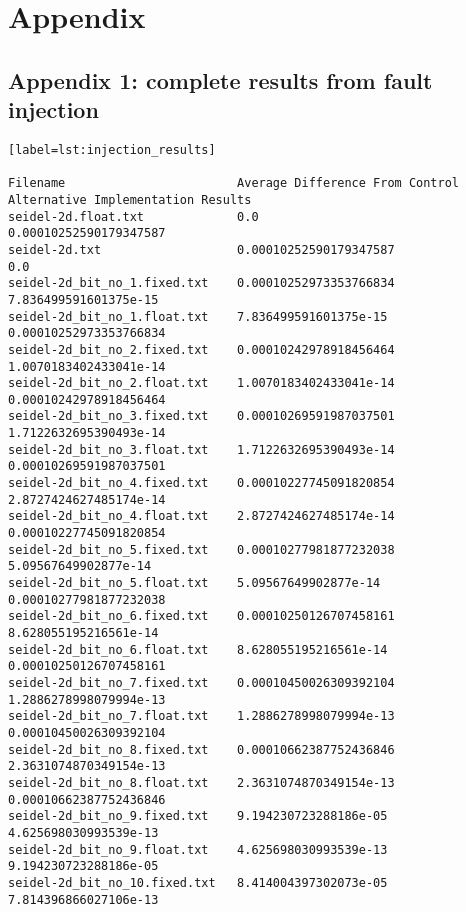 \section{Appendix}

\subsection{Appendix 1: complete results from fault injection}

\begin{verbatim}[label=lst:injection_results]

Filename                        Average Difference From Control         Alternative Implementation Results
seidel-2d.float.txt             0.0                                     0.00010252590179347587
seidel-2d.txt                   0.00010252590179347587                  0.0
seidel-2d_bit_no_1.fixed.txt    0.00010252973353766834                  7.836499591601375e-15
seidel-2d_bit_no_1.float.txt    7.836499591601375e-15                   0.00010252973353766834
seidel-2d_bit_no_2.fixed.txt    0.00010242978918456464                  1.0070183402433041e-14
seidel-2d_bit_no_2.float.txt    1.0070183402433041e-14                  0.00010242978918456464
seidel-2d_bit_no_3.fixed.txt    0.00010269591987037501                  1.7122632695390493e-14
seidel-2d_bit_no_3.float.txt    1.7122632695390493e-14                  0.00010269591987037501
seidel-2d_bit_no_4.fixed.txt    0.00010227745091820854                  2.8727424627485174e-14
seidel-2d_bit_no_4.float.txt    2.8727424627485174e-14                  0.00010227745091820854
seidel-2d_bit_no_5.fixed.txt    0.00010277981877232038                  5.09567649902877e-14
seidel-2d_bit_no_5.float.txt    5.09567649902877e-14                    0.00010277981877232038
seidel-2d_bit_no_6.fixed.txt    0.00010250126707458161                  8.628055195216561e-14
seidel-2d_bit_no_6.float.txt    8.628055195216561e-14                   0.00010250126707458161
seidel-2d_bit_no_7.fixed.txt    0.00010450026309392104                  1.2886278998079994e-13
seidel-2d_bit_no_7.float.txt    1.2886278998079994e-13                  0.00010450026309392104
seidel-2d_bit_no_8.fixed.txt    0.00010662387752436846                  2.3631074870349154e-13
seidel-2d_bit_no_8.float.txt    2.3631074870349154e-13                  0.00010662387752436846
seidel-2d_bit_no_9.fixed.txt    9.194230723288186e-05                   4.625698030993539e-13
seidel-2d_bit_no_9.float.txt    4.625698030993539e-13                   9.194230723288186e-05
seidel-2d_bit_no_10.fixed.txt   8.414004397302073e-05                   7.814396866027106e-13

\end{verbatim}
